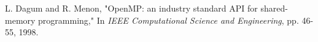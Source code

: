 \begin{thebibliography}{10}
L. Dagum and R. Menon, "OpenMP: an industry standard API for shared-memory programming," In \textit{IEEE Computational Science and Engineering}, pp. 46-55, 1998.
%
%
%
%
%
%
%
%
%
%
%
%

\end{thebibliography}
